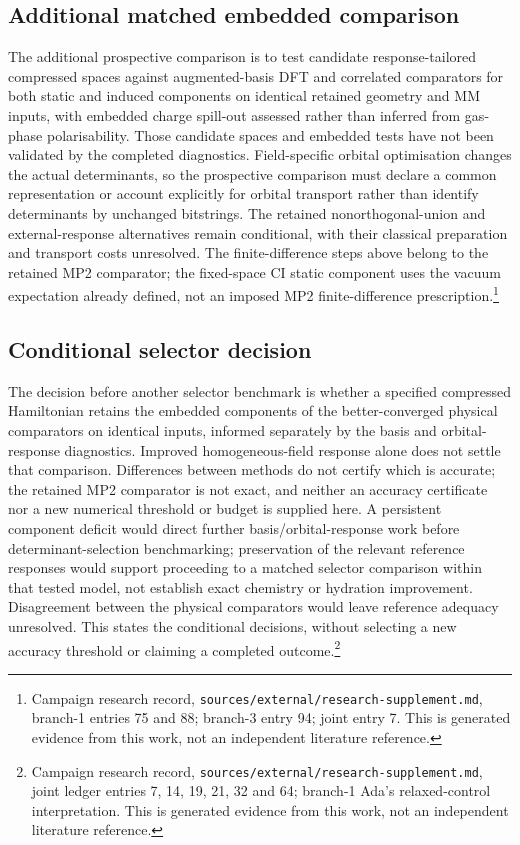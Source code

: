 \documentclass{article}
\newcommand{\record}[1]{\footnote{Campaign research record, \texttt{sources/external/research-supplement.md}, #1. This is generated evidence from this work, not an independent literature reference.}}
\begin{document}
\subsection{Additional matched embedded comparison}
The additional prospective comparison is to test candidate response-tailored compressed spaces against augmented-basis DFT and correlated comparators for both static and induced components on identical retained geometry and MM inputs, with embedded charge spill-out assessed rather than inferred from gas-phase polarisability. Those candidate spaces and embedded tests have not been validated by the completed diagnostics. Field-specific orbital optimisation changes the actual determinants, so the prospective comparison must declare a common representation or account explicitly for orbital transport rather than identify determinants by unchanged bitstrings. The retained nonorthogonal-union and external-response alternatives remain conditional, with their classical preparation and transport costs unresolved. The finite-difference steps above belong to the retained MP2 comparator; the fixed-space CI static component uses the vacuum expectation already defined, not an imposed MP2 finite-difference prescription.\record{branch-1 entries 75 and 88; branch-3 entry 94; joint entry 7}

\subsection{Conditional selector decision}
The decision before another selector benchmark is whether a specified compressed Hamiltonian retains the embedded components of the better-converged physical comparators on identical inputs, informed separately by the basis and orbital-response diagnostics. Improved homogeneous-field response alone does not settle that comparison. Differences between methods do not certify which is accurate; the retained MP2 comparator is not exact, and neither an accuracy certificate nor a new numerical threshold or budget is supplied here. A persistent component deficit would direct further basis/orbital-response work before determinant-selection benchmarking; preservation of the relevant reference responses would support proceeding to a matched selector comparison within that tested model, not establish exact chemistry or hydration improvement. Disagreement between the physical comparators would leave reference adequacy unresolved. This states the conditional decisions, without selecting a new accuracy threshold or claiming a completed outcome.\record{joint ledger entries 7, 14, 19, 21, 32 and 64; branch-1 Ada's relaxed-control interpretation}
\end{document}
